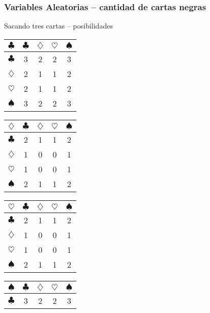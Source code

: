 \documentclass[table]{beamer}
\begin{document}
\begin{frame}
    \frametitle{Variables Aleatorias -- cantidad de cartas negras}
    \begin{block}{Sacando tres cartas -- posibilidades}
        \begin{center}
            \small
            \begin{tabular}{c|cccc}
                $\clubsuit$ & $\clubsuit$ & $\diamondsuit$ & $\heartsuit$ & $\spadesuit$ \\
                \hline
                $\clubsuit$ & 3 & 2 & 2 & 3 \\
                $\diamondsuit$ & 2 & 1 & 1 & 2 \\
                $\heartsuit$ & 2 & 1 & 1 & 2 \\
                $\spadesuit$ & 3 & 2 & 2 & 3
            \end{tabular}
            \begin{tabular}{c|cccc}
                $\diamondsuit$ & $\clubsuit$ & $\diamondsuit$ & $\heartsuit$ & $\spadesuit$ \\
                \hline
                $\clubsuit$ & 2 & 1 & 1 & 2 \\
                $\diamondsuit$ & 1 & 0 & 0 & 1 \\
                $\heartsuit$ & 1 & 0 & 0 & 1 \\
                $\spadesuit$ & 2 & 1 & 1 & 2
            \end{tabular}
        \end{center}
        \begin{center}
            \small
            \begin{tabular}{c|cccc}
                $\heartsuit$ & $\clubsuit$ & $\diamondsuit$ & $\heartsuit$ & $\spadesuit$ \\
                \hline
                $\clubsuit$ & 2 & 1 & 1 & 2 \\
                $\diamondsuit$ & 1 & 0 & 0 & 1 \\
                $\heartsuit$ & 1 & 0 & 0 & 1 \\
                $\spadesuit$ & 2 & 1 & 1 & 2 \\
            \end{tabular}
            \begin{tabular}{c|cccc}
                $\spadesuit$ & $\clubsuit$ & $\diamondsuit$ & $\heartsuit$ & $\spadesuit$ \\
                \hline
                $\clubsuit$ & 3 & 2 & 2 & 3 \\

\end{tabular}
\end{center}
\end{block}
\end{frame}
\end{document}
